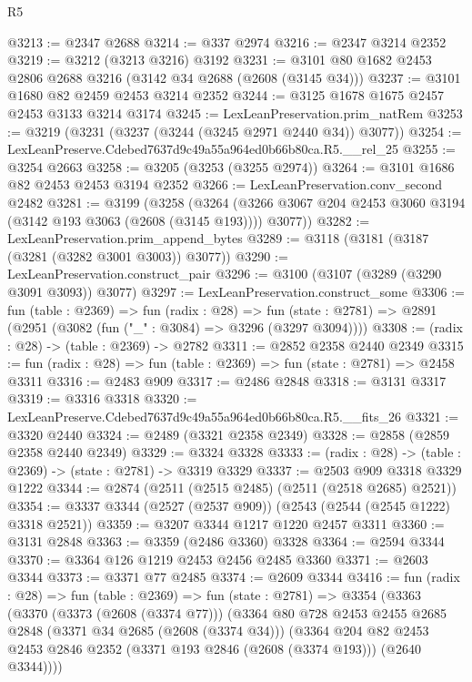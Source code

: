 \begin{lexlean}{R5}
\begin{coremodule}
@3213 := @2347 @2688
@3214 := @337 @2974
@3216 := @2347 @3214 @2352
@3219 := @3212 (@3213 @3216) @3192
@3231 := @3101 @80 @1682 @2453 @2806 @2688 @3216 (@3142 @34 @2688 (@2608 (@3145 @34)))
@3237 := @3101 @1680 @82 @2459 @2453 @3214 @2352
@3244 := @3125 @1678 @1675 @2457 @2453 @3133 @3214 @3174
@3245 := LexLeanPreservation.prim_natRem
@3253 := @3219 (@3231 (@3237 (@3244 (@3245 @2971 @2440 @34)) @3077))
@3254 := LexLeanPreserve.Cdebed7637d9c49a55a964ed0b66b80ca.R5.__rel_25
@3255 := @3254 @2663
@3258 := @3205 (@3253 (@3255 @2974))
@3264 := @3101 @1686 @82 @2453 @2453 @3194 @2352
@3266 := LexLeanPreservation.conv_second @2482
@3281 := @3199
    (@3258
      (@3264 (@3266 @3067 @204 @2453 @3060 @3194 (@3142 @193 @3063 (@2608 (@3145 @193)))) @3077))
@3282 := LexLeanPreservation.prim_append_bytes
@3289 := @3118 (@3181 (@3187 (@3281 (@3282 @3001 @3003)) @3077))
@3290 := LexLeanPreservation.construct_pair
@3296 := @3100 (@3107 (@3289 (@3290 @3091 @3093)) @3077)
@3297 := LexLeanPreservation.construct_some
@3306 := fun (table : @2369) =>
  fun (radix : @28) =>
  fun (state : @2781) => @2891 (@2951 (@3082 (fun ("_" : @3084) => @3296 (@3297 @3094))))
@3308 := (radix : @28) -> (table : @2369) -> @2782
@3311 := @2852 @2358 @2440 @2349
@3315 := fun (radix : @28) => fun (table : @2369) => fun (state : @2781) => @2458 @3311
@3316 := @2483 @909
@3317 := @2486 @2848
@3318 := @3131 @3317
@3319 := @3316 @3318
@3320 := LexLeanPreserve.Cdebed7637d9c49a55a964ed0b66b80ca.R5.__fits_26
@3321 := @3320 @2440
@3324 := @2489 (@3321 @2358 @2349)
@3328 := @2858 (@2859 @2358 @2440 @2349)
@3329 := @3324 @3328
@3333 := (radix : @28) -> (table : @2369) -> (state : @2781) -> @3319 @3329
@3337 := @2503 @909 @3318 @3329 @1222
@3344 := @2874 (@2511 (@2515 @2485) (@2511 (@2518 @2685) @2521))
@3354 := @3337 @3344 (@2527 (@2537 @909)) (@2543 (@2544 (@2545 @1222) @3318 @2521))
@3359 := @3207 @3344 @1217 @1220 @2457 @3311
@3360 := @3131 @2848
@3363 := @3359 (@2486 @3360) @3328
@3364 := @2594 @3344
@3370 := @3364 @126 @1219 @2453 @2456 @2485 @3360
@3371 := @2603 @3344
@3373 := @3371 @77 @2485
@3374 := @2609 @3344
@3416 := fun (radix : @28) =>
  fun (table : @2369) =>
  fun (state : @2781) =>
  @3354
    (@3363
      (@3370
        (@3373 (@2608 (@3374 @77)))
        (@3364
          @80
          @728
          @2453
          @2455
          @2685
          @2848
          (@3371 @34 @2685 (@2608 (@3374 @34)))
          (@3364
            @204
            @82
            @2453
            @2453
            @2846
            @2352
            (@3371 @193 @2846 (@2608 (@3374 @193)))
            (@2640 @3344))))

\end{coremodule}
\end{lexlean}
